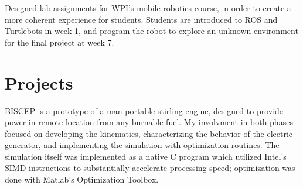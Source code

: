 \documentclass[letterpaper]{deedy-resume} %
\begin{document}
\begin{minipage}[t]{0.66\textwidth}
\sectionspace %



\begin{tightitemize}
\item Designed lab assignments for WPI's mobile robotics course, in order to create a more coherent experience for students.  Students are introduced to ROS and Turtlebots in week 1, and program the robot to explore an unknown environment for the final project at week 7.
\end{tightitemize}

\sectionspace %


%
%

\end{minipage} 





\section{Projects}

BISCEP is a prototype of a man-portable stirling engine, designed to provide power in remote location from any burnable fuel.  My involvment in both phases focused on developing the kinematics, characterizing the behavior of the electric generator, and implementing the simulation with optimization routines.  The simulation itself was implemented as a native C program which utilized Intel's SIMD instructions to substantially accelerate processing speed; optimization was done with Matlab's Optimization Toolbox.
\end{document}
